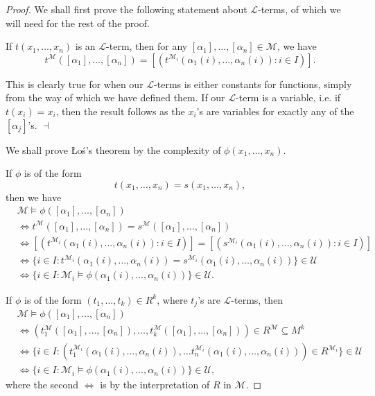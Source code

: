 \documentclass[notoc,notitlepage]{tufte-book}
\begin{document}
\begin{proof}
  We shall first prove the following statement about $\mathcal{L}$-terms, of which we will need for the rest of the proof.

  \noindent
   If $t(x_1, \ldots, x_n)$ is an $\mathcal{L}$-term, then for any $[\alpha_1], \ldots, [\alpha_n] \in \mathcal{M}$, we have
  \begin{equation*}
    t^\mathcal{M} ( [ \alpha_1 ], \ldots, [ \alpha_n ] ) = [ ( t^{\mathcal{M}_i} ( \alpha_1(i), \ldots, \alpha_n(i) ) : i \in I ) ].
  \end{equation*}

  \noindent
   This is clearly true for when our $\mathcal{L}$-terms is either constants for functions, simply from the way of which we have defined them. If our $\mathcal{L}$-term is a variable, i.e. if $t(x_i) = x_i$, then the result follows as the $x_i$'s are variables for exactly any of the $[\alpha_j]$'s. $\dashv$

  \noindent
  We shall prove {\L}o\'{s}'s theorem by the complexity of $\phi(x_1, \ldots, x_n)$.

  \noindent
   If $\phi$ is of the form
  \begin{equation*}
    t(x_1, \ldots, x_n) = s (x_1, \ldots, x_n),
  \end{equation*}
  then we have
  \begin{align*}
    &\mathcal{M} \models \phi([\alpha_1], \ldots, [\alpha_n]) \\
    &\iff t^\mathcal{M} ( [\alpha_1], \ldots, [\alpha_n] ) = s^\mathcal{M} ( [\alpha_1], \ldots, [\alpha_n] ) \\
    &\iff [(t^{\mathcal{M}_i} ( \alpha_1(i), \ldots, \alpha_n(i) ) : i \in I)] = [( s^{\mathcal{M}_i} ( \alpha_1(i), \ldots, \alpha_n(i) ) : i \in I )] \\
    &\iff \{ i \in I : t^{\mathcal{M}_i} ( \alpha_1(i), \ldots, \alpha_n(i) ) = s^{\mathcal{M}_i} ( \alpha_1(i), \ldots, \alpha_n(i) ) \} \in \mathcal{U} \\
    &\iff \{ i \in I : \mathcal{M}_i \models \phi( \alpha_1(i), \ldots, \alpha_n(i) ) \} \in \mathcal{U}.
  \end{align*}

  If $\phi$ is of the form $(t_1, \ldots, t_k) \in R^k$, where $t_j$'s are $\mathcal{L}$-terms, then
  \begin{align*}
    &\mathcal{M} \models \phi([\alpha_1], \ldots, [\alpha_n]) \\
    &\iff ( t_1^{\mathcal{M}}([\alpha_1], \ldots, [\alpha_n]), \ldots, t_k^\mathcal{M}([\alpha_1], \ldots, [\alpha_n]) ) \in R^\mathcal{M} \subseteq M^k \\
    &\iff \{ i \in I : (t_1^{\mathcal{M}_i}(\alpha_1(i), \ldots, \alpha_n(i)), \ldots t_n^{\mathcal{M}_i}(\alpha_1(i), \ldots, \alpha_n(i))) \in R^{\mathcal{M}_i} \} \in \mathcal{U} \\
    &\iff \{ i \in I : \mathcal{M}_i \models \phi(\alpha_1(i), \ldots, \alpha_n(i)) \} \in \mathcal{U},
  \end{align*}
  where the second $\iff$ is by the interpretation of $R$ in $\mathcal{M}$.


\end{proof}
\end{document}
